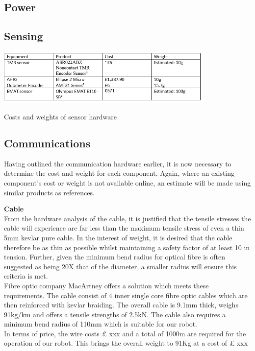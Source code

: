 \documentclass[11pt]{article}		%
\begin{document}
		\subsection{Power}
		
		\subsection{Sensing}
		
	  		\begin{table}[h]
				\centering
				\includegraphics[width = 0.8\textwidth]{sensor hardware.PNG}
				\caption{Costs and weights of sensor hardware}
				\label{sensorHardware}
			\end{table}
			
		\subsection{Communications}
			Having outlined the communication hardware earlier, it is now necessary to determine the cost and weight for each component. Again, where an existing component’s cost or weight is not available online, an estimate will be made using similar products as references. 
			
			\textbf{Cable}\\
			From the hardware analysis of the cable, it is justified that the tensile stresses the cable will experience are far less than the maximum tensile stress of even a thin 5mm kevlar pure cable. In the interest of weight, it is desired that the cable therefore be as thin as possible whilst maintaining a safety factor of at least 10 in tension. Further, given the minimum bend radius for optical fibre is often suggested as being 20X that of the diameter, a smaller radius will ensure this criteria is met.\\
	    	\hspace*{3ex}Fibre optic company MacArtney offers a solution which meets these requirements. The cable consist of 4 inner single core fibre optic cables which are then reinforced with kevlar braiding. The overall cable is 9.1mm thick, weighs 91kg/km and offers a tensile strengths of 2.5kN. The cable also requires a minimum bend radius of 110mm which is suitable for our robot. \\
	    	\hspace*{3ex}In terms of price, the wire costs £ xxx and a total of 1000m are required for the operation of our robot. This brings the overall weight to 91Kg at a cost of £ xxx 
	
\end{document}
